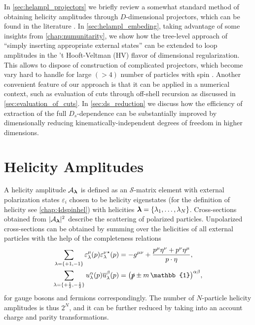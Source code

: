 In \cref{sec:helampl_projectors} we briefly review a somewhat standard 
method of obtaining helicity amplitudes through $D$-dimensional projectors,
which can be found in the literature \cite{Garland:2002ak, Moch:2002hm, Glover:2003cm, Glover:2004si,Gehrmann:2009vu,Gehrmann:2011aa}. 
In \cref{sec:helampl_embeding}, 
taking advantage of some insights from \cref{chap:numunitarity},
we show how the tree-level approach of ``simply inserting appropriate external states'' can
be extended to loop amplitudes in the 't Hooft-Veltman (HV) flavor of dimensional regularization.
This allows to dispose of construction of complicated projectors, which
become vary hard to handle for large $(> 4)$ number of particles with spin \cite{Peraro:2019cjj}. 
Another convenient feature of our approach is that it can be applied in a numerical context, such
as evaluation of cuts through off-shell recursion as discussed in \cref{sec:evaluation_of_cuts}.
In \cref{sec:ds_reduction} we discuss how
the efficiency of extraction of the full $D_s$-dependence can be substantially improved
by dimensionally reducing kinematically-independent degrees of freedom in higher dimensions.



\section{Helicity Amplitudes}

A helicity amplitude $\mathcal{A}_{\vb*{\lambda}}$
is defined as an $\mathcal{S}$-matrix element
with external polarization states $\varepsilon_{i}$ chosen to be
helicity eigenstates (for the definition of helicity see \cref{chap:4dspinhel}) with helicities $\vb*{\lambda}=\{\lambda_1,\ldots{},\lambda_N\}$.
Cross-sections obtained from $\vert \mathcal{A}_{\vb*{\lambda}}{} \vert^2$ describe
the scattering of polarized particles.
Unpolarized cross-sections can be obtained by summing over the helicities of all external particles
with the help of the completeness relations
\begin{subequations}
  \label{eq:4d_completeness_relations}
  \begin{align}
    \sum_{\lambda=\{+1,-1\}} \varepsilon^\mu_\lambda(p){\varepsilon^\nu_\lambda}^{\star{}}(p)  &= -g^{\mu\nu} + \frac{p^\mu \eta^\nu + p^\nu \eta^\mu}{\sp(p,\eta)}, \\
    \sum_{\lambda=\{+\frac{1}{2},-\frac{1}{2}\}} u^\alpha_\lambda(p){\overline{u}_\lambda^\beta}(p)  &= \qty(\slashed{p}  \pm m\,\mathbb{1})^{\alpha\beta},
  \end{align}
\end{subequations}
for gauge bosons and fermions correspondingly.
The number of $N$-particle helicity amplitudes is thus $2^N$, and
it can be further reduced by taking into an account charge and parity transformations.

